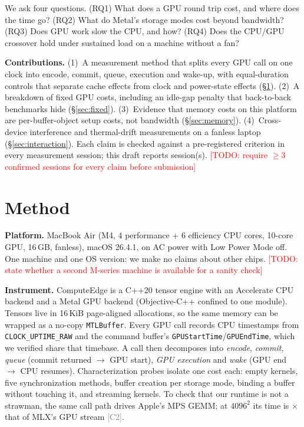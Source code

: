 \documentclass[conference,10pt]{IEEEtran}
\newcommand{\todo}[1]{\textcolor{red}{[TODO: #1]}}
\newcommand{\claim}[1]{\textcolor{gray}{\scriptsize[#1]}}
\newcommand{\todo}[1]{}
\newcommand{\claim}[1]{}
\begin{document}
We ask four questions. (RQ1) What does a GPU round trip cost, and where does the time go? (RQ2) What do Metal's
storage modes cost beyond bandwidth? (RQ3) Does GPU work slow the CPU, and how? (RQ4) Does the CPU/GPU crossover
hold under sustained load on a machine without a fan?

\textbf{Contributions.}
(1)~A measurement method that splits every GPU call on one clock into encode, commit, queue, execution and
wake-up, with equal-duration controls that separate cache effects from clock and power-state effects (\S\ref{sec:method}).
(2)~A breakdown of fixed GPU costs, including an idle-gap penalty that back-to-back benchmarks hide (\S\ref{sec:fixed}).
(3)~Evidence that memory costs on this platform are per-buffer-object setup costs, not bandwidth (\S\ref{sec:memory}).
(4)~Cross-device interference and thermal-drift measurements on a fanless laptop (\S\ref{sec:interaction}).
Each claim is checked against a pre-registered criterion in every measurement session; this draft reports
\NumSessions{} session(s). \todo{require $\geq$3 confirmed sessions for every claim before submission}

\section{Method}\label{sec:method}

\textbf{Platform.} MacBook Air (M4, 4 performance + 6 efficiency CPU cores, 10-core GPU, 16\,GB, fanless),
macOS 26.4.1, on AC power with Low Power Mode off. One machine and one OS version: we make no claims about other
chips. \todo{state whether a second M-series machine is available for a sanity check}

\textbf{Instrument.} ComputeEdge is a C++20 tensor engine with an Accelerate CPU backend and a Metal GPU backend
(Objective-C++ confined to one module). Tensors live in 16\,KiB page-aligned allocations, so the same memory can be
wrapped as a no-copy \texttt{MTLBuffer}. Every GPU call records CPU timestamps from
\texttt{CLOCK\_UPTIME\_RAW} and the command buffer's \texttt{GPUStartTime}/\texttt{GPUEndTime}, which we verified
share that timebase. A call then decomposes into \emph{encode}, \emph{commit}, \emph{queue} (commit returned
$\rightarrow$ GPU start), \emph{GPU execution} and \emph{wake} (GPU end $\rightarrow$ CPU resumes). Characterization
probes isolate one cost each: empty kernels, five synchronization methods, buffer creation per storage mode,
binding a buffer without touching it, and streaming kernels. To check that our runtime is not a strawman, the same
call path drives Apple's MPS GEMM; at $4096^2$ its time is \MlxParityRatio{}$\times$ that of MLX's GPU
stream \claim{C2}.
\end{document}
